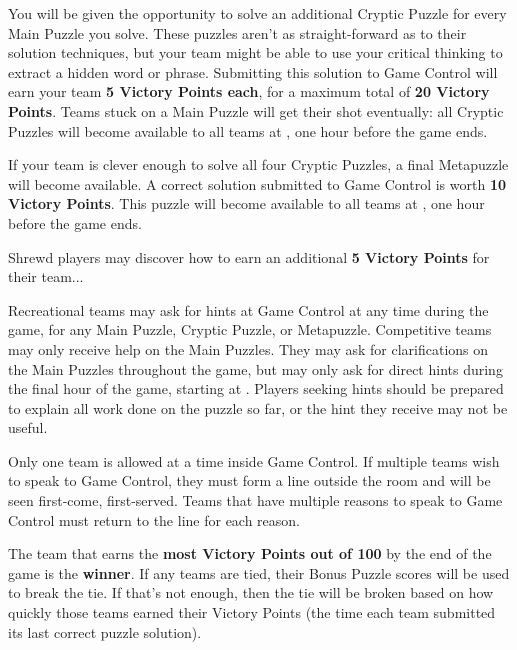 \begin{multicols}{2}

You will be given the opportunity to solve an additional Cryptic Puzzle for
every Main Puzzle you solve. These puzzles aren't as straight-forward
as to their solution techniques, but your team might be able to use your
critical thinking to extract a hidden word or phrase. Submitting this
solution to Game Control will earn your team \textbf{5 Victory Points each},
for a maximum total of \textbf{20 Victory Points}.
Teams stuck on a Main Puzzle will get their shot eventually: all
Cryptic Puzzles will become available to all teams at \underline{\hspace{5em}},
one hour before the game ends.


If your team is clever enough to solve all four Cryptic Puzzles, a final
Metapuzzle will become available. A correct solution submitted to Game
Control is worth \textbf{10 Victory Points}. This puzzle will become available
to all teams at \underline{\hspace{5em}}, one hour before the game ends.


Shrewd players may discover how to earn an additional
\textbf{5 Victory Points} for their team...


Recreational teams may ask for hints at Game Control at any time during
the game, for any Main Puzzle, Cryptic Puzzle, or Metapuzzle.
Competitive teams may only receive help on the Main Puzzles. They may
ask for clarifications on the Main Puzzles throughout the game, but may only
ask for direct hints during the final hour of the game, starting at
\underline{\hspace{5em}}. Players seeking hints should be prepared to
explain all work done on the puzzle so far, or the hint they receive may not
be useful.

\columnbreak


Only one team is allowed at a time inside Game Control. If multiple teams
wish to speak to Game Control, they must form a line outside the room
and will be seen first-come, first-served. Teams that have multiple reasons
to speak to Game Control must return to the line for each reason.


The team that earns the \textbf{most Victory Points out of 100}
by the end of the game is the \textbf{winner}. If any teams are tied,
their Bonus Puzzle scores will be used to break the tie. If that's not enough,
then the tie will be broken based on how quickly those teams earned their
Victory Points (the time each team submitted its last correct puzzle solution).
\end{multicols}

